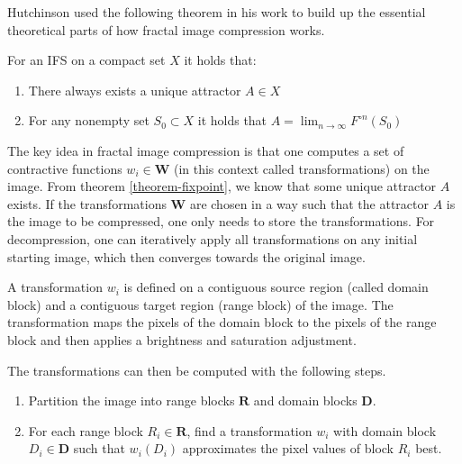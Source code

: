 Hutchinson used the following theorem in his work \cite{hutchinson1981fractals}
to build up the essential theoretical parts of how fractal image compression works.

\begin{theorem}\label{theorem-fixpoint}
  For an IFS on a compact set $X$ it holds that:

  \begin{enumerate}[topsep=0pt,itemsep=-1ex,partopsep=1ex,parsep=1ex]
    \item There always exists a unique attractor $A \in X$
    \item For any nonempty set $S_0 \subset X$ it holds that
      $A = \lim_{n \to \infty} F^{\circ n}(S_0)$
  \end{enumerate}
\end{theorem}

 The key idea in fractal image compression
is that one computes a set of contractive functions $w_i \in \boldsymbol{W}$ (in
this context called transformations) on the image. From theorem
\ref{theorem-fixpoint}, we know that some unique attractor $A$ exists. If the
transformations $\boldsymbol{W}$ are chosen in a way such that the attractor $A$
is the image to be compressed, one only needs to store the transformations. For
decompression, one can iteratively apply all transformations on any initial
starting image, which then converges towards the original image.

A transformation $w_i$ is defined on a contiguous source region (called domain
block) and a contiguous target region (range block) of the image. The
transformation maps the pixels of the domain block to the pixels of the range
block and then applies a brightness and saturation adjustment.

The transformations can then be computed with the following steps.

\begin{enumerate}[topsep=0pt,itemsep=-1ex,partopsep=1ex,parsep=1ex]
  \item Partition the image into range blocks $\boldsymbol{R}$ and domain blocks
    $\boldsymbol{D}$.
  \item For each range block $R_i \in \boldsymbol{R}$, find a transformation
    $w_i$ with domain block $D_i \in \boldsymbol{D}$ such that $w_i(D_i)$
    approximates the pixel values of block $R_i$ best.
\end{enumerate}

